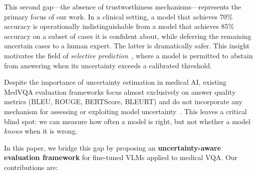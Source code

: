 \documentclass[pdflatex,sn-mathphys-num]{sn-jnl}
\begin{document}
This second gap---the absence of trustworthiness mechanisms---represents the primary focus of our work. In a clinical setting, a model that achieves 70\% accuracy is operationally indistinguishable from a model that achieves 85\% accuracy on a subset of cases it is confident about, while deferring the remaining uncertain cases to a human expert. The latter is dramatically safer. This insight motivates the field of \textit{selective prediction}~\cite{geifman2017selective,el2010foundations}, where a model is permitted to abstain from answering when its uncertainty exceeds a calibrated threshold.

Despite the importance of uncertainty estimation in medical AI, existing MedVQA evaluation frameworks focus almost exclusively on answer quality metrics (BLEU, ROUGE, BERTScore, BLEURT) and do not incorporate any mechanism for assessing or exploiting model uncertainty~\cite{gautam2025kvasirx1,lin2023medvqa}. This leaves a critical blind spot: we can measure how often a model is right, but not whether a model \textit{knows} when it is wrong.

In this paper, we bridge this gap by proposing an \textbf{uncertainty-aware evaluation framework} for fine-tuned VLMs applied to medical VQA. Our contributions are:
\end{document}
